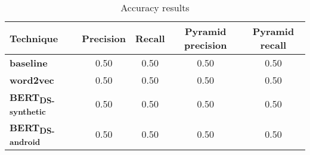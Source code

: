 \begin{table}[H]
\centering    
\begin{small}
\begin{threeparttable}
\begin{tabular}{lcccc}


\textbf{Technique} & 
\textbf{Precision} & \textbf{Recall} & 
\parbox[c][.9cm][c]{1.5cm}{\centering \textbf{Pyramid precision}} & 
\parbox[c][.9cm][c]{1.5cm}{\centering \textbf{Pyramid recall}} \\


\hline


\textbf{baseline} &
0.50 & 0.50 & 
0.50 & 0.50 
\\

\textbf{word2vec} &
0.50 & 0.50 & 
0.50 & 0.50 
\\

\textbf{BERT\textsubscript{DS-synthetic}} &
0.50 & 0.50 & 
0.50 & 0.50 
\\

\textbf{BERT\textsubscript{DS-android}} &
0.50 & 0.50 & 
0.50 & 0.50 
\\

\hline

\end{tabular}
\end{threeparttable}
\end{small}
\caption{Accuracy results}
\label{tbl:approach-results-overall}
\end{table}


